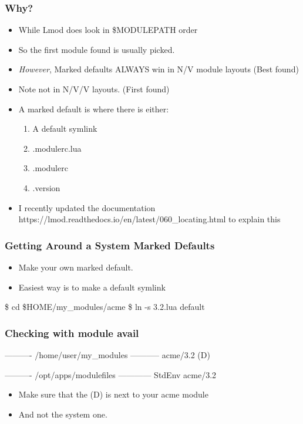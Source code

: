 \documentclass{beamer}
\begin{document}
\begin{frame}[fragile]
    \frametitle{Why?}
  \begin{itemize}
    \item While Lmod does look in \$MODULEPATH order
    \item So the first module found is usually picked.
    \item {\color{red}\emph{However}}, Marked defaults ALWAYS win in
      N/V module layouts (Best found)
    \item Note not in N/V/V layouts. (First found)
    \item A marked default is where there is either:
      \begin{enumerate}
        \item A default symlink
        \item .modulerc.lua
        \item .modulerc
        \item .version
      \end{enumerate}
    \item I recently updated the documentation
      https://lmod.readthedocs.io/en/latest/060_locating.html
      to explain this
  \end{itemize}
\end{frame}

\begin{frame}[fragile]
    \frametitle{Getting Around a System Marked Defaults}
  \begin{itemize}
    \item Make your own marked default.
    \item Easiest way is to make a default symlink
  \end{itemize}
 {\tiny
    \begin{semiverbatim}
        \$ cd \$HOME/my\_modules/acme
        \$ ln -s 3.2.lua default
    \end{semiverbatim}
}
\end{frame}



\begin{frame}[fragile]
    \frametitle{Checking with module avail}
 {\tiny
    \begin{semiverbatim}
   ---------- /home/user/my\_modules -----------
   acme/3.2 (D) 
 
   ---------- /opt/apps/modulefiles ------------
   StdEnv    acme/3.2

    \end{semiverbatim}
}
  \begin{itemize}
    \item Make sure that the (D) is next to your acme module 
    \item And not the system one.
  \end{itemize}
\end{frame}
\end{document}
